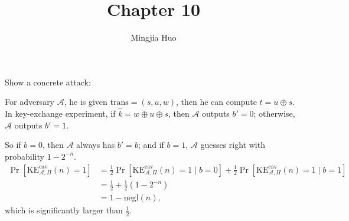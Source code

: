 \documentclass[a4paper]{article}
\newcommand{\negl}{\text{negl}}
\newcommand{\eav}{\text{eav}}
\newcommand{\KE}{\text{KE}}
\newcommand{\trans}{\text{trans}}
\newcommand{\A}{\mathcal{A}}
\newenvironment{problem}[2][Problem]{\begin{trivlist}
\item[\hskip \labelsep {\bfseries #1}\hskip \labelsep {\bfseries #2.}]}{\end{trivlist}}
\begin{document}
 
 
\title{Chapter 10}
\author{Mingjia Huo}
\date{}
\maketitle

\begin{problem}{10.4}
Show a concrete attack:\par
For adversary $\A$, he is given $\trans=(s,u,w)$, then he can compute $t=u\oplus s$. In key-exchange experiment, if $\hat k=w\oplus u\oplus s$, then $\A$ outputs $b'=0$; otherwise, $\A$ outputs $b'=1$.\par
So if $b=0$, then $\A$ always has $b'=b$; and if $b=1$, $\A$ guesses right with probability $1-2^{-n}$.
\begin{align*}
    \Pr[\KE_{\A,\Pi}^{\eav}(n)=1]&=\frac12\Pr[\KE_{\A,\Pi}^{\eav}(n)=1\mid b=0]+\frac12\Pr[\KE_{\A,\Pi}^{\eav}(n)=1\mid b=1]\\
    &=\frac12+\frac12(1-2^{-n})\\
    &=1-\negl(n),
\end{align*}which is significantly larger than $\frac12$.
\end{problem}
\end{document}

